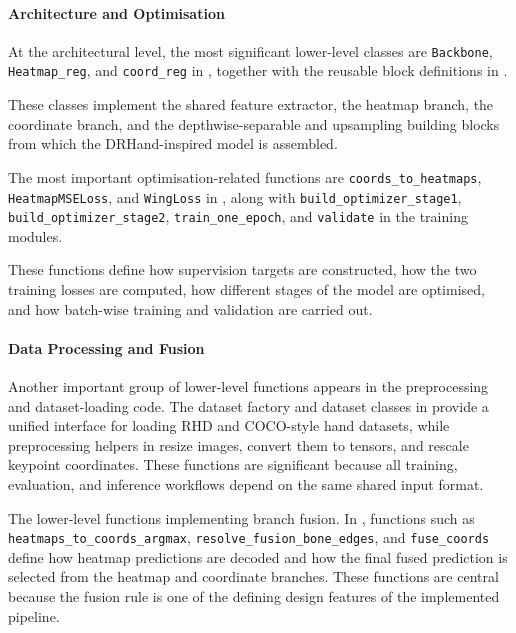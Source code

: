 ﻿\documentclass[11pt,a4paper]{article}
\begin{document}
\paragraph*{Architecture and Optimisation}

At the architectural level, the most significant lower-level classes are
\texttt{Backbone}, \texttt{Heatmap\_reg}, and \texttt{coord\_reg} in
, together with the reusable block
definitions in .

\medskip

\noindent
These classes implement the shared feature extractor, the heatmap branch, the
coordinate branch, and the depthwise-separable and upsampling building blocks
from which the DRHand-inspired model is assembled.

\medskip

\noindent
The most important optimisation-related functions are
\texttt{coords\_to\_heatmaps}, \texttt{HeatmapMSELoss}, and \texttt{WingLoss}
in , along with
\texttt{build\_optimizer\_stage1}, \texttt{build\_optimizer\_stage2},
\texttt{train\_one\_epoch}, and \texttt{validate} in the training modules.

These functions define how supervision targets are constructed, how the two
training losses are computed, how different stages of the model are
optimised, and how batch-wise training and validation are carried out.

\paragraph*{Data Processing and Fusion}

Another important group of lower-level functions appears in the preprocessing
and dataset-loading code. The dataset factory and dataset classes in
 provide a unified interface for loading RHD and
COCO-style hand datasets, while preprocessing helpers in
 resize images, convert them to
tensors, and rescale keypoint coordinates. These functions are significant
because all training, evaluation, and inference workflows depend on the same
shared input format.

\medskip

\noindent
The lower-level functions implementing branch fusion. In
, functions such as
\texttt{heatmaps\_to\_coords\_argmax}, \texttt{resolve\_fusion\_bone\_edges},
and \texttt{fuse\_coords} define how heatmap predictions are decoded and how
the final fused prediction is selected from the heatmap and coordinate
branches. These functions are central because the fusion rule is one of the
defining design features of the implemented pipeline.
\end{document}
